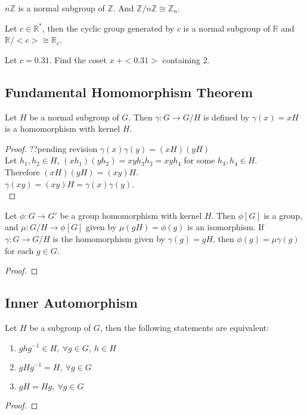 \begin{remark}
	$n\mathbb{Z}$ is a normal subgroup of $\mathbb{Z}$. And $\mathbb{Z}/n\mathbb{Z} \cong \mathbb{Z}_n$.
\end{remark}

\begin{remark}
	Let $c \in \mathbb{R}^*$, then the cyclic group generated by $c$ is a normal subgroup of $\mathbb{R}$ and $\mathbb{R}/<c> \cong \mathbb{R}_c$.
\end{remark}

\begin{question}
	Let $c = 0.31$. Find the coset $x\ +<0.31>$ containing $2$.
\end{question}

\subsection{Fundamental Homomorphism Theorem}
\begin{theorem}
	Let $H$ be a normal subgroup of $G$. Then $\gamma : G \to G/H$ is defined by $\gamma(x) = xH$  is a homomorphism with kernel $H$.
\end{theorem}
\begin{proof}
??pending revision	
	$\gamma(x)\gamma(y) = (xH)(yH)$\\
	Let $h_1,h_2 \in H$, $(xh_1)(yh_2) = xyh_3h_2 = xyh_4$ for some $h_3,h_4 \in H$.\\
	Therefore $(xH)(yH) = (xy)H$.\\
	$\gamma(xy) = (xy)H = \gamma(x)\gamma(y)$.\\
\end{proof}

\begin{theorem}
	Let $\phi : G \to G'$ be a group homomorphism with kernel $H$. Then $\phi[G]$ is a group, and $\mu : G/H \to \phi[G]$ given by $\mu(gH) = \phi(g)$ is an isomorphism. If $\gamma : G \to G/H$ is the homomorphism given by $\gamma(g) = gH$, then $\phi(g) = \mu\gamma(g)$ for each $g \in G$.
\end{theorem}
\begin{proof}
\end{proof}

\subsection{Inner Automorphism}
\begin{theorem}
	Let $H$ be a subgroup of $G$, then the following statements are equivalent:
	\begin{enumerate}
		\item $ghg^{-1} \in H,\ \forall g \in G,\ h \in H$
		\item $gHg^{-1} = H,\ \forall g \in G$
		\item $gH = Hg,\ \forall g \in G$
	\end{enumerate}
\end{theorem}
\begin{proof}
\end{proof}


